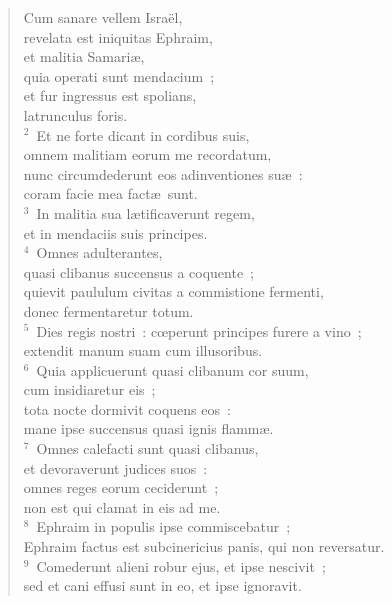 \begin{flushleft}\begin{verse}\vspace{-19pt}Cum sanare vellem Isra\"el,\\ revelata est iniquitas Ephraim,\\ et malitia Samari\ae ,\\ quia operati sunt mendacium~;\\ et fur ingressus est spolians,\\ latrunculus foris.\\
${}^{2}$~Et ne forte dicant in cordibus suis,\\ omnem malitiam eorum me recordatum,\\ nunc circumdederunt eos adinventiones su\ae~:\\ coram facie mea fact\ae\ sunt.\\
${}^{3}$~In malitia sua l\ae tificaverunt regem,\\ et in mendaciis suis principes.\\
${}^{4}$~Omnes adulterantes,\\ quasi clibanus succensus a coquente~;\\ quievit paululum civitas a commistione fermenti,\\ donec fermentaretur totum.\\
${}^{5}$~Dies regis nostri~: cœperunt principes furere a vino~;\\ extendit manum suam cum illusoribus.\\
${}^{6}$~Quia applicuerunt quasi clibanum cor suum,\\ cum insidiaretur eis~;\\ tota nocte dormivit coquens eos~:\\ mane ipse succensus quasi ignis flamm\ae .\\
${}^{7}$~Omnes calefacti sunt quasi clibanus,\\ et devoraverunt judices suos~:\\ omnes reges eorum ceciderunt~;\\ non est qui clamat in eis ad me.\\
${}^{8}$~Ephraim in populis ipse commiscebatur~;\\ Ephraim factus est subcinericius panis, qui non reversatur.\\
${}^{9}$~Comederunt alieni robur ejus, et ipse nescivit~;\\ sed et cani effusi sunt in eo, et ipse ignoravit.\\

\end{verse}
\end{flushleft}

